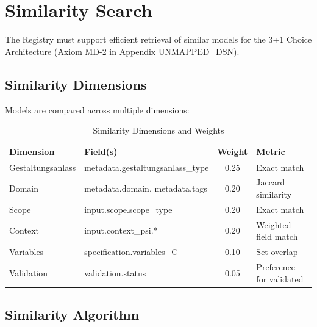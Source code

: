 \section{Similarity Search}
\label{sec:fff-similarity}

The Registry must support efficient retrieval of similar models for the 3+1
Choice Architecture (Axiom MD-2 in Appendix UNMAPPED_DSN).

\subsection{Similarity Dimensions}

Models are compared across multiple dimensions:

\begin{table}[htbp]
\centering
\caption{Similarity Dimensions and Weights}
\label{tab:fff-similarity}
\renewcommand{\arraystretch}{1.3}
\begin{tabular}{@{}llcl@{}}
\toprule
\textbf{Dimension} & \textbf{Field(s)} & \textbf{Weight} & \textbf{Metric} \\
\midrule
Gestaltungsanlass & metadata.gestaltungsanlass\_type & 0.25 & Exact match \\
Domain & metadata.domain, metadata.tags & 0.20 & Jaccard similarity \\
Scope & input.scope.scope\_type & 0.20 & Exact match \\
Context & input.context\_psi.* & 0.20 & Weighted field match \\
Variables & specification.variables\_C & 0.10 & Set overlap \\
Validation & validation.status & 0.05 & Preference for validated \\
\bottomrule
\end{tabular}
\end{table}

\subsection{Similarity Algorithm}

